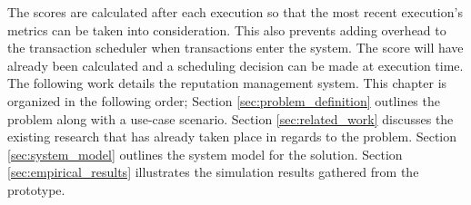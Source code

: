
The scores are calculated after each execution so that the most recent execution's metrics can be taken into consideration. This also prevents adding overhead to the transaction scheduler when transactions enter the system. The score will have already been calculated and a scheduling decision can be made at execution time. The following work details the reputation management system. This chapter is organized in the following order; Section \ref{sec:problem_definition} outlines the problem along with a use-case scenario. Section \ref{sec:related_work} discusses the existing research that has already taken place in regards to the problem. Section \ref{sec:system_model} outlines the system model for the solution. Section \ref{sec:empirical_results} illustrates the simulation results gathered from the prototype.

